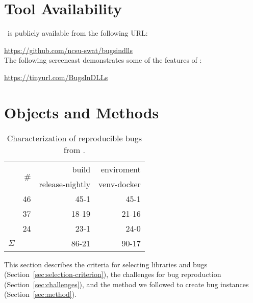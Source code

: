 \documentclass[sigconf,screen]{acmart}
\begin{document}

\section{Tool Availability}
\label{sec:tool-availability}
\tname\ is publicly available from the following URL:

\url{https://github.com/ncsu-swat/bugsindlls}\\

The following screencast demonstrates some
of the features of \tname:

\url{https://tinyurl.com/BugsInDLLs}\\

\section{Objects and Methods}

\begin{table}
  \centering
  \caption{\label{table:bug-characterization}Characterization of
    reproducible bugs from \tname.}
\begin{tabular}{l|rrr}
  \toprule & \multirow{2}{*}{\#} & \multicolumn{1}{r}{build} &
  \multicolumn{1}{r}{enviroment} \\ & & release-nightly & venv-docker
  \\ \cmidrule(lr){2-4} \jax{} & 46 & 45-1 & 45-1 \\ \torch{} & 37 &
  18-19 & 21-16 \\ \tf{} & 24 & 23-1 & 24-0 \\ \midrule
  \multicolumn{1}{c|}{$\Sigma$} & \numbugs{} & 86-21& 90-17
  \\ \bottomrule
\end{tabular}
\end{table}

This section describes the criteria for selecting libraries and bugs
(Section~\ref{sec:selection-criterion}), the challenges for bug
reproduction (Section~\ref{sec:challenges}), and the method we
followed to create bug instances (Section~\ref{sec:method}).
\end{document}
